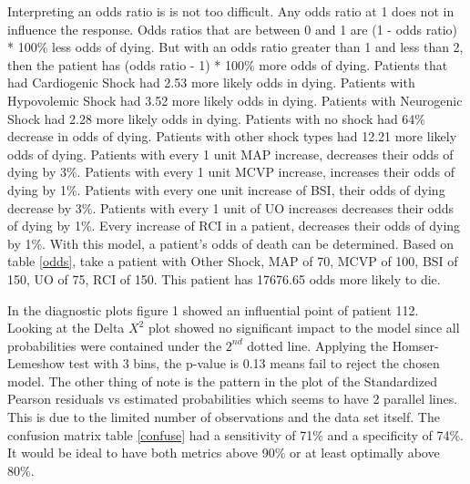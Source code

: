 \documentclass{article}\usepackage[]{graphicx}\usepackage[]{color}
\begin{document}
\qquad Interpreting an odds ratio is is not too difficult. Any odds ratio at 1 does not in
influence the response. Odds ratios that are between 0 and 1 are (1 - odds ratio) * 100\% less odds of  dying. But with an odds ratio greater than 1 and less than 2, then the patient has (odds ratio - 1)
* 100\% more odds of dying.
Patients that had Cardiogenic Shock had 2.53 more likely odds in dying. Patients with Hypovolemic Shock had 3.52 more likely odds in dying. Patients with Neurogenic Shock had 2.28 more likely odds in dying. Patients with no shock had 64\% decrease in odds of dying. Patients with other shock types had 12.21 more likely odds of dying. Patients with every 1 unit MAP increase, decreases their odds of dying by 3\%. Patients with every 1 unit MCVP increase, increases their odds of dying by 1\%. Patients with every one unit increase of BSI, their odds of dying decrease by 3\%. Patients with every 1 unit of UO increases decreases their odds of dying by 1\%. Every increase of RCI in a patient, decreases their odds of dying by 1\%.
With this model, a patient's odds of death can be determined. Based on table \ref{odds}, take a patient with Other Shock, MAP of 70, MCVP of 100, BSI of 150, UO of 75, RCI of 150. This patient has 17676.65 odds more likely to die.
 
\qquad In the diagnostic plots figure 1 showed an influential point of patient 112. Looking at the Delta $X^2$ plot showed no significant impact to the model since all probabilities were contained under the $2^{nd}$ dotted line. Applying the Homser-Lemeshow test with 3 bins, the p-value is 0.13 means fail to reject the chosen model. The other thing of note is the pattern in the plot of the Standardized Pearson residuals vs estimated probabilities which seems to have 2 parallel lines. This is due to the limited number of observations and the data set itself. The confusion matrix table \ref{confuse} had a sensitivity of 71\% and a specificity of 74\%. It would be ideal to have both metrics above 90\% or at least optimally above 80\%.
\end{document}
